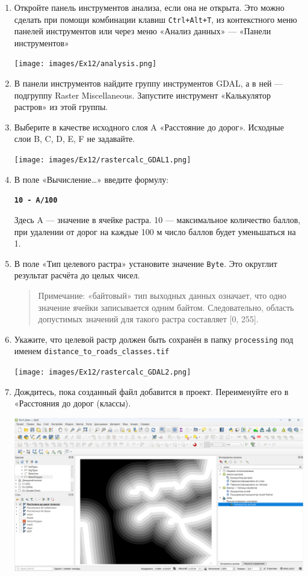 \documentclass[
  12pt,
]{book}
\begin{document}
\begin{enumerate}
\def\labelenumi{\arabic{enumi}.}
\item
  Откройте панель инструментов анализа, если она не открыта. Это можно сделать при помощи комбинации клавиш \texttt{Ctrl+Alt+T}, из контекстного меню панелей инструментов или через меню «Анализ данных» --- «Панели инструментов»

  \texttt{[image: images/Ex12/analysis.png]}
\item
  В панели инструментов найдите группу инструментов GDAL, а в ней --- подгруппу Raster Miscellaneous. Запустите инструмент «Калькулятор растров» из этой группы.
\item
  Выберите в качестве исходного слоя A «Расстояние до дорог». Исходные слои B, C, D, E, F не задавайте.

  \texttt{[image: images/Ex12/rastercalc\_GDAL1.png]}
\item
  В поле «Вычисление\ldots» введите формулу:

  \textbf{\texttt{10\ -\ A/100}}

  Здесь A --- значение в ячейке растра. 10 --- максимальное количество баллов, при удалении от дорог на каждые 100 м число баллов будет уменьшаться на 1.
\item
  В поле «Тип целевого растра» установите значение \texttt{Byte}. Это округлит результат расчёта до целых чисел.

  \begin{quote}
  Примечание: «байтовый» тип выходных данных означает, что одно значение ячейки записывается одним байтом. Следовательно, область допустимых значений для такого растра составляет {[}0, 255{]}.
  \end{quote}
\item
  Укажите, что целевой растр должен быть сохранён в папку \texttt{processing} под именем \texttt{distance\_to\_roads\_classes.tif}

  \texttt{[image: images/Ex12/rastercalc\_GDAL2.png]}
\item
  Дождитесь, пока созданный файл добавится в проект. Переименуйте его в «Расстояния до дорог (классы).

  \includegraphics{images/Ex12/distance_to_roads_classes.png}


\end{enumerate}
\end{document}
